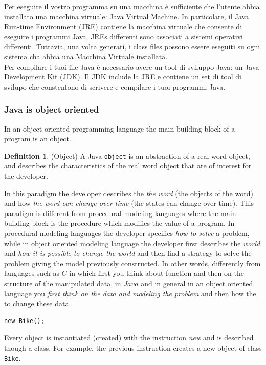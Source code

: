 \documentclass{article}
\theoremstyle{definition}
\newtheorem{mydef}{Definition}
\begin{document}
Per eseguire il vostro programma su una macchina \`e sufficiente che l'utente abbia installato una macchina virtuale: Java Virtual Machine. In particolare, il Java Run-time Environment (JRE) contiene la macchina virtuale che consente di eseguire i programmi Java.  JREs differenti sono associati a sistemi operativi differenti. Tuttavia, una volta generati, i class files possono essere eseguiti su ogni sistema cha abbia una Macchina Virtuale installata. \\
Per compilare i tuoi file Java \`e necessario avere un tool di sviluppo Java: un Java Development Kit (JDK). Il JDK include la JRE e contiene un set di tool di svilupo che constentono di scrivere e compilare i tuoi programmi Java.




\subsubsection{Java is object oriented}
In an object oriented programming language the main building block of a program is an object.
\begin{mydef} (Object) A Java \texttt{object} is an abstraction of a real word object, and  describes the characteristics of the real word object that are of interest for the developer.
\end{mydef}
In this paradigm the developer describes the \emph{the word} (the objects of the word) and how \emph{the word can change over time} (the states can change over time). This paradigm is different from procedural modeling languages where the main building block is the procedure which modifies the value of a program. In procedural modeling languages the developer specifies \emph{how to solve} a problem, while in object oriented modeling language the developer first describes the \emph{world} and \emph{how it is possible to change the world} and then find a strategy to solve the problem giving the model previously constructed. In other words, differently from languages such as $C$ in which first you think about function and then on the structure of the manipulated data, in $Java$ and in general in an object oriented language you \emph{first think on the data and modeling the problem} and then how the to change these data. 

\begin{lstlisting}
new Bike();
\end{lstlisting}
Every object is instantiated (created) with the instruction \emph{new} and is described though a class. For example, the previous instruction creates a new object of class \texttt{Bike}.
\end{document}
